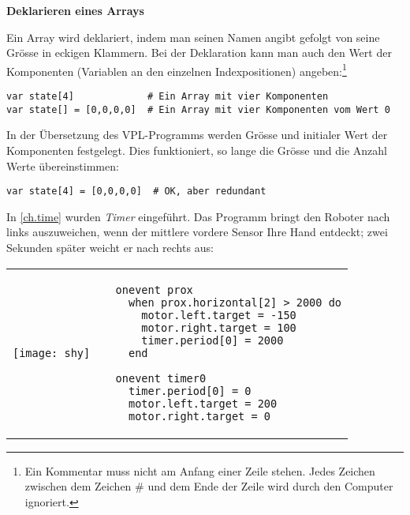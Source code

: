 \textbf{\large Deklarieren eines Arrays}

Ein Array wird deklariert, indem man seinen Namen angibt gefolgt von seine Grösse in eckigen Klammern. Bei der Deklaration kann man auch den Wert der Komponenten (Variablen an den einzelnen Indexpositionen) angeben:\footnote{Ein Kommentar muss nicht am Anfang einer Zeile stehen. Jedes Zeichen zwischen dem Zeichen \# und dem Ende der Zeile wird durch den Computer ignoriert.}

\begin{footnotesize}
\begin{verbatim}
var state[4]             # Ein Array mit vier Komponenten  
var state[] = [0,0,0,0]  # Ein Array mit vier Komponenten vom Wert 0
\end{verbatim}
\end{footnotesize}

In der Übersetzung des VPL-Programms werden Grösse und initialer Wert der Komponenten festgelegt. Dies funktioniert, so lange die Grösse und die Anzahl Werte übereinstimmen:

\begin{footnotesize}
\begin{verbatim}
var state[4] = [0,0,0,0]  # OK, aber redundant
\end{verbatim}
\end{footnotesize}

\newpage


In \cref{ch.time} wurden \emph{Timer} eingeführt. Das Programm  bringt den Roboter nach links auszuweichen, wenn der mittlere vordere Sensor Ihre Hand entdeckt; zwei Sekunden später weicht er nach rechts aus: 

\begin{center}
\begin{tabular}{ll}
\texttt{[image: shy]} &
\begin{minipage}[b]{.5\textwidth}
\begin{footnotesize}
\begin{verbatim}
  onevent prox
    when prox.horizontal[2] > 2000 do
      motor.left.target = -150
      motor.right.target = 100
      timer.period[0] = 2000
    end
  
  onevent timer0
    timer.period[0] = 0
    motor.left.target = 200
    motor.right.target = 0
\end{verbatim}
\end{footnotesize}
\end{minipage}
\end{tabular}
\end{center}

